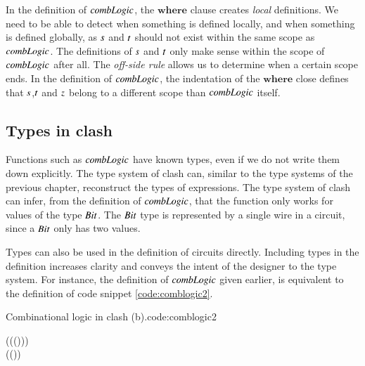 In the definition of \ensuremath{\Varid{combLogic}}, the \ensuremath{\mathbf{where}} clause creates \textit{local} definitions.
We need to be able to detect when something is defined locally, and when something is defined globally, as \ensuremath{\Varid{s}} and \ensuremath{\Varid{t}} should not exist within the same scope as \ensuremath{\Varid{combLogic}}.
The definitions of \ensuremath{\Varid{s}} and \ensuremath{\Varid{t}} only make sense within the scope of \ensuremath{\Varid{combLogic}} after all.
The \textit{off-side rule} allows us to determine when a certain scope ends.
In the definition of \ensuremath{\Varid{combLogic}}, the indentation of the \ensuremath{\mathbf{where}} close defines that \ensuremath{\Varid{s}},\ensuremath{\Varid{t}} and \ensuremath{\Varid{z}} belong to a different scope than \ensuremath{\Varid{combLogic}} itself.

\subsection{Types in \gls{clash}}
Functions such as \ensuremath{\Varid{combLogic}} have known types, even if we do not write them down explicitly.
The type system of \gls{clash} can, similar to the type systems of the previous chapter, reconstruct the types of expressions.
The type system of \gls{clash} can infer, from the definition of \ensuremath{\Varid{combLogic}}, that the function only works for values of the type \ensuremath{\Conid{Bit}}.
The \ensuremath{\Conid{Bit}} type is represented by a single wire in a circuit, since a \ensuremath{\Conid{Bit}} only has two values.

Types can also be used in the definition of circuits directly.
Including types in the definition increases clarity and conveys the intent of the designer to the type system.
For instance, the definition of \ensuremath{\Varid{combLogic}} given earlier, is equivalent to the definition of code snippet \ref{code:comblogic2}.

\begin{texexptitled}{Combinational logic in \gls{clash} (b).}{code:comblogic2}\begin{hscode}\SaveRestoreHook
{}%
%
%
%
\>[B]{}\mathbin{::}\to (\to (\to (\to {}))){}\<[E]%
\\
\>[B]{}\;\;\;\;\mathrel{=}(\;(\;\;)){}\<[E]%
\\
\>[B]{}\<[6]%
\>[6]{}\<[E]%
\\
\>[6]{}\<[10]%
\>[10]{}\mathrel{=}\;\;\<[E]%
\\
\>[6]{}\<[10]%
\>[10]{}\mathrel{=}\;\;\<[E]%
\ColumnHook
\end{hscode}\resethooks
\end{texexptitled}

